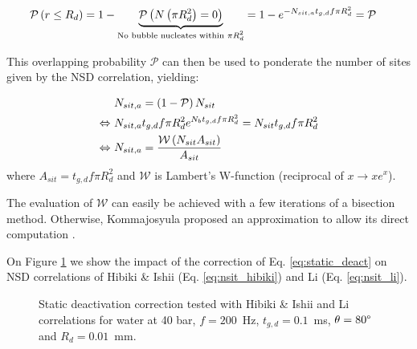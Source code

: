 \begin{align}
\mathcal{P}\left( r\leq R_{d} \right) &=1-\underbrace{ \mathcal{P}\left( N\left( \pi R_{d}^{2} \right)=0 \right) }_{\text{No bubble nucleates within $\pi R_{d}^{2}$}} = 1-e^{-N_{sit,a}t_{g,d}f\pi R_{d}^{2}} = \mathcal{P}
\end{align}

This overlapping probability $\mathcal{P}$ can then be used to ponderate the number of sites given by the NSD correlation, yielding:

\begin{align}
&N_{sit,a}=\parth{1-\mathcal{P}}N_{sit} \\
%
\Leftrightarrow\  &N_{sit,a}t_{g,d}f\pi R_{d}^{2}e^{N_{b}t_{g,d}f \pi R_{d}^{2}}= N_{sit}t_{g,d}f \pi R_{d}^{2} \\
%
\Leftrightarrow\   &N_{sit,a} = \frac{\mathcal{W}\parth{N_{sit}{A_{sit}}}}{{A_{sit}}}
\label{eq:static_deact}
\end{align}
where $A_{sit}=t_{g,d}f \pi R_{d}^{2}$ and $\mathcal{W}$ is Lambert's W-function (reciprocal of $x \rightarrow xe^{x}$).


The evaluation of $\mathcal{W}$ can easily be achieved with a few iterations of a bisection method. Otherwise, Kommajosyula proposed an approximation to allow its direct computation \cite{kommajosyula_development_2020}.



\npar

On Figure \ref{fig:nsit_CSR} we show the impact of the correction of Eq. \ref{eq:static_deact} on NSD correlations of Hibiki \& Ishii (Eq. \ref{eq:nsit_hibiki}) and Li \etal (Eq. \ref{eq:nsit_li}).


\begin{figure}
\centering
{}
\caption{Static deactivation correction tested with Hibiki \& Ishii and Li \etal correlations for water at 40 bar, $f=200$~Hz, $t_{g,d} = 0.1$~ms, $\theta=80\degree$ and $R_{d} = 0.01$~mm.}
\label{fig:nsit_CSR}
\end{figure}


